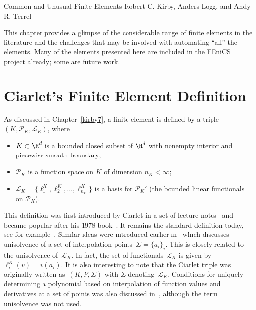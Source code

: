               {Common and Unusual Finite Elements}
              {Robert C. Kirby, Anders Logg, and Andy R. Terrel}

\newcommand{\elemententry}[1]{\null

\texttt{[image: \#1]}}

This chapter provides a glimpse of the considerable range of finite
elements in the literature and the challenges that may be involved
with automating ``all'' the elements. Many of the elements presented
here are included in the FEniCS project already; some are future work.

\section{Ciarlet's Finite Element Definition}

As discussed in Chapter~\ref{kirby7}, a finite element is defined by a
triple $(K, \mathcal{P}_K, \mathcal{L}_K)$, where
\begin{itemize}
\item
  $K \subset \R^d$ is a bounded closed subset of $\R^d$ with nonempty
  interior and piecewise smooth boundary;
\item
  $\mathcal{P}_K$ is a function space on $K$ of dimension $n_K < \infty$;
\item
  $\mathcal{L}_K = \{\ell^K_1, \ell^K_2, \ldots, \ell^K_{n_K}\}$ is a
  basis for $\mathcal{P}_K'$ (the bounded linear functionals on
  $\mathcal{P}_K$).
\end{itemize}

This definition was first introduced by Ciarlet in a set of lecture
notes~\cite{Ciarlet1975} and became popular after his 1978
book~\cite{Ciarlet1978,Ciarlet2002}. It remains the standard
definition today, see for example~\cite{BrennerScott2008}. Similar
ideas were introduced earlier in~\cite{CiarletRaviart1972} which
discusses unisolvence of a set of interpolation points~$\Sigma =
\{a_i\}_i$. This is closely related to the unisolvence of~$\mathcal{L}_K$. In fact, the set of
functionals~$\mathcal{L}_K$ is given by $\ell^K_i(v) = v(a_i)$. It is
also interesting to note that the Ciarlet triple was originally
written as~$(K,P,\Sigma)$ with $\Sigma$
denoting~$\mathcal{L}_K$. Conditions for uniquely determining a
polynomial based on interpolation of function values and derivatives
at a set of points was also discussed in~\cite{BrambleZlamal1970},
although the term unisolvence was not used.

